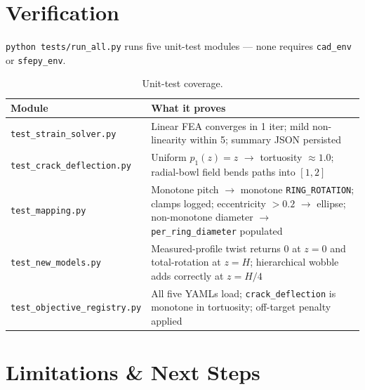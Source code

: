 \documentclass[11pt, letterpaper]{article}
\begin{document}
\section{Verification}

\texttt{python tests/run\_all.py} runs five unit-test modules --- none requires \texttt{cad\_env} or \texttt{sfepy\_env}.

\begin{table}[h!]
\centering
\caption{Unit-test coverage.}
\label{tab:tests}
\small
\renewcommand{\arraystretch}{1.25}
\begin{tabularx}{\linewidth}{l X}
\toprule
\textbf{Module} & \textbf{What it proves} \\
\midrule
\texttt{test\_strain\_solver.py}    & Linear FEA converges in 1 iter; mild non-linearity within 5; summary JSON persisted \\
\texttt{test\_crack\_deflection.py} & Uniform $p_1(z) = z$ $\to$ tortuosity $\approx 1.0$; radial-bowl field bends paths into $[1, 2]$ \\
\texttt{test\_mapping.py}           & Monotone pitch $\to$ monotone \texttt{RING\_ROTATION}; clamps logged; eccentricity $> 0.2$ $\to$ ellipse; non-monotone diameter $\to$ \texttt{per\_ring\_diameter} populated \\
\texttt{test\_new\_models.py}       & Measured-profile twist returns 0 at $z=0$ and total-rotation at $z=H$; hierarchical wobble adds correctly at $z=H/4$ \\
\texttt{test\_objective\_registry.py} & All five YAMLs load; \texttt{crack\_deflection} is monotone in tortuosity; off-target penalty applied \\
\bottomrule
\end{tabularx}
\end{table}

\section{Limitations \& Next Steps}
\end{document}
